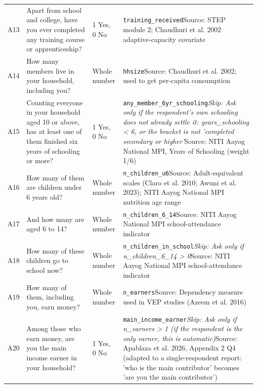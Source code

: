 \documentclass[10pt]{article}
\begin{document}
{\begin{longtable}{p{0.8cm}p{6.4cm}p{3.6cm}p{5.8cm}}
A13 & Apart from school and college, have you ever completed any training course or apprenticeship? & 1 Yes, 0 No & \texttt{training\_received}\newline Source: STEP module 2; Chaudhuri et al. 2002 adaptive-capacity covariate \\
A14 & How many members live in your household, including you? & Whole number & \texttt{hhsize}\newline Source: Chaudhuri et al. 2002; used to get per-capita consumption \\
A15 & Counting everyone in your household aged 10 or above, has at least one of them finished six years of schooling or more? & 1 Yes, 0 No & \texttt{any\_member\_6yr\_schooling}\newline \textit{Skip: Ask only if the respondent's own schooling does not already settle it: years\_schooling < 6, or the bracket is not 'completed secondary or higher'}\newline Source: NITI Aayog National MPI, Years of Schooling (weight 1/6) \\
A16 & How many of them are children under 6 years old? & Whole number & \texttt{n\_children\_u6}\newline Source: Adult-equivalent scales (Claro et al. 2010; Awuni et al. 2023); NITI Aayog National MPI nutrition age range \\
A17 & And how many are aged 6 to 14? & Whole number & \texttt{n\_children\_6\_14}\newline Source: NITI Aayog National MPI school-attendance indicator \\
A18 & How many of these children go to school now? & Whole number & \texttt{n\_children\_in\_school}\newline \textit{Skip: Ask only if n\_children\_6\_14 > 0}\newline Source: NITI Aayog National MPI school-attendance indicator \\
A19 & How many of them, including you, earn money? & Whole number & \texttt{n\_earners}\newline Source: Dependency measure used in VEP studies (Azeem et al. 2016) \\
A20 & Among those who earn money, are you the main income earner in your household? & 1 Yes, 0 No & \texttt{main\_income\_earner}\newline \textit{Skip: Ask only if n\_earners > 1 (if the respondent is the only earner, this is automatic)}\newline Source: Apablaza et al. 2026, Appendix 2 Q4 (adapted to a single-respondent report: 'who is the main contributor' becomes 'are you the main contributor') \\
\bottomrule
\end{longtable}
}
\end{document}
